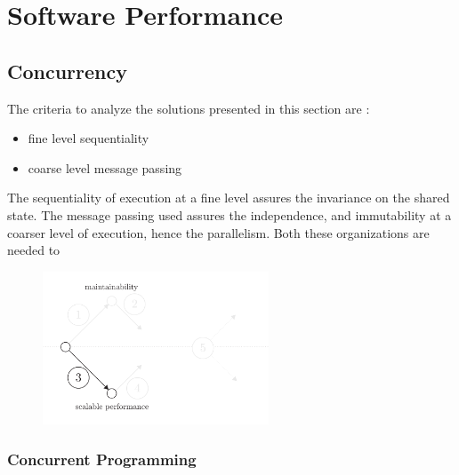 \section{Software Performance} \label{chapter3:software-performance}





\subsection{Concurrency}





The criteria to analyze the solutions presented in this section are :
\begin{itemize}
\item fine level sequentiality
\item coarse level message passing
\end{itemize}

The sequentiality of execution at a fine level assures the invariance on the shared state.
The message passing used assures the independence, and immutability at a coarser level of execution, hence the parallelism.
Both these organizations are needed to 


\begin{figure}[h!]
\begin{center}
\includegraphics[width=0.6\textwidth]{../ressources/state-of-the-art-3.pdf}
\end{center}
\end{figure}



\subsubsection{Concurrent Programming} \label{chapter3:software-maintainability:concurrency:concurrent-programming}

